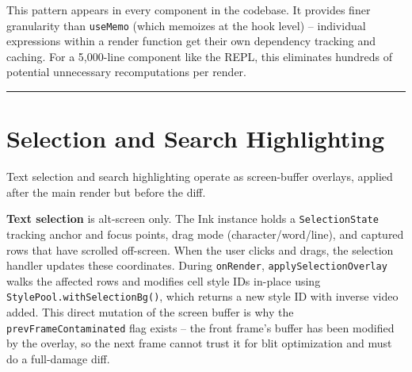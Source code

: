 \documentclass[
  english,
  11pt,
  letterpaper,
]{book}
\newenvironment{Shaded}{\begin{snugshade}}{\end{snugshade}}
\newcommand{\CommentTok}[1]{\textcolor[rgb]{0.37,0.37,0.37}{#1}}
\newcommand{\ControlFlowTok}[1]{\textcolor[rgb]{0.00,0.23,0.31}{\textbf{#1}}}
\newcommand{\DecValTok}[1]{\textcolor[rgb]{0.68,0.00,0.00}{#1}}
\newcommand{\FunctionTok}[1]{\textcolor[rgb]{0.28,0.35,0.67}{#1}}
\newcommand{\KeywordTok}[1]{\textcolor[rgb]{0.00,0.23,0.31}{\textbf{#1}}}
\newcommand{\NormalTok}[1]{\textcolor[rgb]{0.00,0.23,0.31}{#1}}
\newcommand{\OperatorTok}[1]{\textcolor[rgb]{0.37,0.37,0.37}{#1}}
\begin{document}
\begin{Shaded}
\end{Shaded}

This pattern appears in every component in the codebase. It provides
finer granularity than \texttt{useMemo} (which memoizes at the hook
level) -- individual expressions within a render function get their own
dependency tracking and caching. For a 5,000-line component like the
REPL, this eliminates hundreds of potential unnecessary recomputations
per render.

\begin{center}\rule{0.5\linewidth}{0.5pt}\end{center}

\section{Selection and Search
Highlighting}\label{selection-and-search-highlighting}

Text selection and search highlighting operate as screen-buffer
overlays, applied after the main render but before the diff.

\textbf{Text selection} is alt-screen only. The Ink instance holds a
\texttt{SelectionState} tracking anchor and focus points, drag mode
(character/word/line), and captured rows that have scrolled off-screen.
When the user clicks and drags, the selection handler updates these
coordinates. During \texttt{onRender}, \texttt{applySelectionOverlay}
walks the affected rows and modifies cell style IDs in-place using
\texttt{StylePool.withSelectionBg()}, which returns a new style ID with
inverse video added. This direct mutation of the screen buffer is why
the \texttt{prevFrameContaminated} flag exists -- the front frame's
buffer has been modified by the overlay, so the next frame cannot trust
it for blit optimization and must do a full-damage diff.
\end{document}

